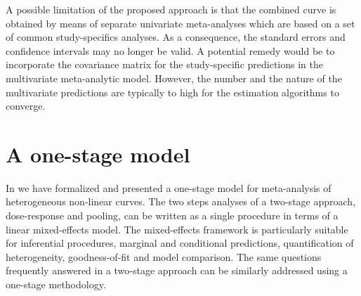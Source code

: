 \documentclass[11pt,a4paper,twoside,openany]{book}\usepackage{knitr}
\begin{document}
{A possible limitation of the proposed approach is that the combined curve is obtained by means of separate univariate meta-analyses which are based on a set of common study-specifics analyses. As a consequence, the standard errors and confidence intervals may no longer be valid. A potential remedy would be to incorporate the covariance matrix for the study-specific predictions in the multivariate meta-analytic model. However, the number and the nature of the multivariate predictions are typically to high for the estimation algorithms to converge.


\section{A one-stage model}

In  we have formalized and presented a one-stage model for meta-analysis of heterogeneous non-linear curves. The two steps analyses of a two-stage approach, dose-response and pooling, can be written as a single procedure in terms of a linear mixed-effects model. The mixed-effects framework is particularly suitable for inferential procedures, marginal and conditional predictions, quantification of heterogeneity, goodness-of-fit and model comparison. The same questions frequently answered in a two-stage approach can be similarly addressed using a one-stage methodology. 

}
\end{document}
